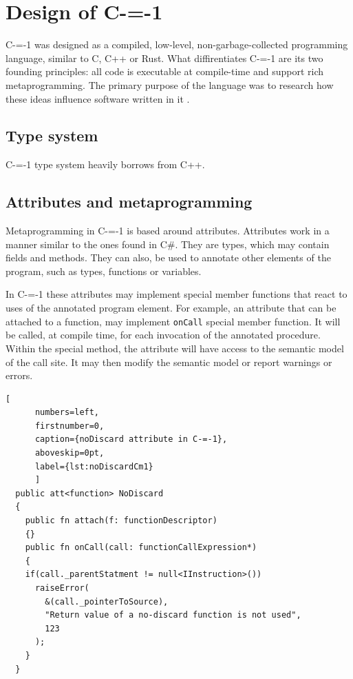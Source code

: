 \section{Design of C-=-1}
\label{language-design}

C-=-1 was designed as a compiled, low-level, non-garbage-collected programming language, similar to C, C++ or Rust.
What diffirentiates C-=-1 are its two founding principles: all code is executable at compile-time and support rich metaprogramming.
The primary purpose of the language was to research how these ideas influence software written in it \cite{grabski2022compilation}.

\subsection{Type system}

C-=-1 type system heavily borrows from C++.

\subsection{Attributes and metaprogramming}

Metaprogramming in C-=-1 is based around attributes.
Attributes work in a manner similar to the ones found in C\#.
They are types, which may contain fields and methods.
They can also, be used to annotate other elements of the program, such as types, functions or variables.

In C-=-1 these attributes may implement special member functions that react to uses of the annotated program element.
For example, an attribute that can be attached to a function, may implement \lstinline{onCall} special member function.
It will be called, at compile time, for each invocation of the annotated procedure.
Within the special method, the attribute will have access to the semantic model of the call site.
It may then modify the semantic model or report warnings or errors.

\begin{minipage}{\linewidth}

	\begin{lstlisting}[
	  numbers=left,
	  firstnumber=0,
	  caption={noDiscard attribute in C-=-1},
	  aboveskip=0pt,
	  label={lst:noDiscardCm1}
	  ]
  public att<function> NoDiscard
  {
	public fn attach(f: functionDescriptor)
	{}
	public fn onCall(call: functionCallExpression*)
	{
	if(call._parentStatment != null<IInstruction>())
	  raiseError(
		&(call._pointerToSource),
		"Return value of a no-discard function is not used",
		123
	  );
	}
  }
  \end{lstlisting}
\end{minipage}

